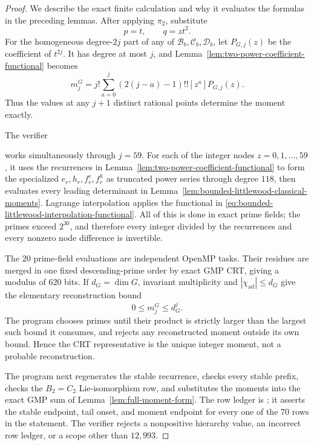 \documentclass[11pt,reqno]{amsart}
\theoremstyle{plain}
\theoremstyle{definition}
\newcommand{\chiad}{\chi_{\mathrm{ad}}}
\begin{document}
\begin{proof}
We describe the exact finite calculation and why it evaluates the formulas
in the preceding lemmas.  After applying $\pi_2$, substitute
\[
 p=t,\qquad q=zt^2.
\]
For the homogeneous degree-$2j$ part of any of
$\mathcal B_b,\mathcal C_b,\mathcal D_b$, let $P_{G,j}(z)$ be the
coefficient of $t^{2j}$.  It has degree at most $j$, and
Lemma~\ref{lem:two-power-coefficient-functional} becomes
\begin{equation}
\label{eq:bounded-littlewood-interpolation-functional}
 m_j^G=j!\sum_{a=0}^{j}(2(j-a)-1)!![z^a]P_{G,j}(z).
\end{equation}
Thus the values at any $j+1$ distinct rational points determine the moment
exactly.

The verifier
\begin{center}
\end{center}
works simultaneously through $j=59$.  For each of the integer nodes
$z=0,1,\ldots,59$, it uses the recurrences in
Lemma~\ref{lem:two-power-coefficient-functional} to form the specialized
$e_r,h_r,f_r^e,f_r^h$ as truncated power series through degree $118$, then
evaluates every leading determinant in
Lemma~\ref{lem:bounded-littlewood-classical-moments}.  Lagrange interpolation
applies the functional in
\eqref{eq:bounded-littlewood-interpolation-functional}.  All of this is done
in exact prime fields; the primes exceed $2^{30}$, and therefore every
integer divided by the recurrences and every nonzero node difference is
invertible.

The $20$ prime-field evaluations are independent OpenMP tasks.  Their
residues are merged in one fixed descending-prime order by exact GMP CRT,
giving a modulus of $620$ bits.  If $d_G=\dim G$, invariant multiplicity and
$|\chiad|\leq d_G$ give the elementary reconstruction bound
\[
 0\leq m_j^G\leq d_G^j.
\]
The program chooses primes until their product is strictly larger than the
largest such bound it consumes, and rejects any reconstructed moment outside
its own bound.  Hence the CRT representative is the unique integer moment,
not a probable reconstruction.

The program next regenerates the stable recurrence, checks every stable
prefix, checks the $B_2=C_2$ Lie-isomorphism row, and substitutes the moments
into the exact GMP sum of Lemma~\ref{lem:full-moment-form}.  The row ledger is
; it asserts the
stable endpoint, tail onset, and moment endpoint for every one of the $70$
rows in the statement.  The verifier rejects a nonpositive hierarchy value,
an incorrect row ledger, or a scope other than $12{,}993$.


\end{proof}
\end{document}
